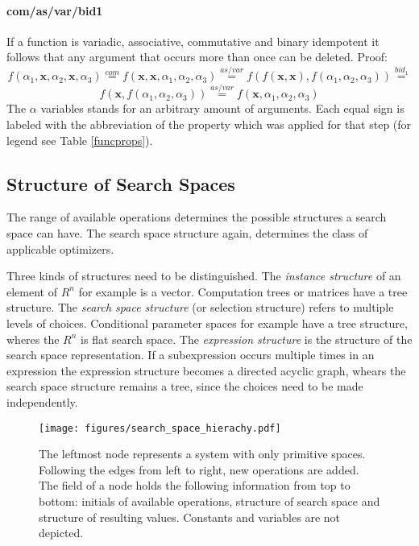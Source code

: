 \documentclass[english]{article}
\begin{document}
\paragraph{com/as/var/bid1}
If a function is variadic, associative, commutative and binary idempotent it follows that any argument that occurs more than once can be deleted. Proof:
$$f(\alpha_1, \mathbf{x}, \alpha_2, \mathbf{x}, \alpha_3) \stackrel{com}{=}
f(\mathbf{x},\mathbf{x}, \alpha_1, \alpha_2, \alpha_3) \stackrel{as/var}{=}
f(f(\mathbf{x},\mathbf{x}), f(\alpha_1, \alpha_2, \alpha_3)) \stackrel{bid_1}{=}$$
$$f(\mathbf{x}, f(\alpha_1, \alpha_2, \alpha_3)) \stackrel{as/var}{=}
f(\mathbf{x}, \alpha_1, \alpha_2, \alpha_3)$$
The $\alpha$ variables stands for an arbitrary amount of arguments. Each equal sign is labeled with the abbreviation of the property which was applied for that step (for legend see Table \ref{funcprops}).


\subsection{Structure of Search Spaces}
The range of available operations determines the possible structures a search space can have. The search space structure again, determines the class of applicable optimizers.

Three kinds of structures need to be distinguished. The \textit{instance structure} of an element of $R^n$ for example is a vector. Computation trees or matrices have a tree structure. The \textit{search space structure} (or selection structure) refers to multiple levels of choices. Conditional parameter spaces for example have a tree structure, wheres the $R^n$ is flat search space. The \textit{expression structure} is the structure of the search space representation. If a subexpression occurs multiple times in an expression the expression structure becomes a directed acyclic graph, whears the search space structure remains a tree, since the choices need to be made independently.

\begin{figure}[h]
\texttt{[image: figures/search\_space\_hierachy.pdf]}
  \caption{The leftmost node represents a system with only primitive spaces. Following the edges from left to right, new operations are added. The field of a node holds the following information from top to bottom: initials of available operations, structure of search space and structure of resulting values. Constants and variables are not depicted.}
  \label{space_structure}
\end{figure}
\end{document}
